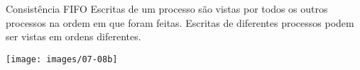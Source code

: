 \begin{frame}{Consistência FIFO}
Escritas de um processo são vistas por todos os outros processos na ordem em que foram feitas. Escritas de diferentes processos podem ser vistas em ordens diferentes.

\texttt{[image: images/07-08b]}
\end{frame}



%
%
%
%
%
%
%
%
